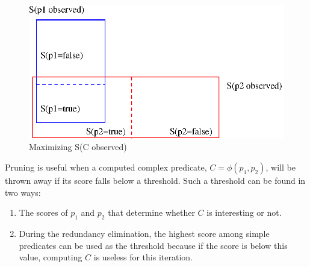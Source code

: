 \begin{figure}[h]
  \centering
  \includegraphics[scale = 0.6]{charts/maxsuccess}
  \caption{Maximizing S(C observed)}
  \label{maxsuccess}
\end{figure}


Pruning is useful when a computed complex predicate, $C = \phi(p_1, p_2)$, will be thrown away if its score falls below a threshold.  Such a threshold can be found in two ways:
\begin{enumerate}
\item The scores of $p_1$ and $p_2$ that determine whether $C$ is interesting or not.
\item During the redundancy elimination, the highest %
score among simple predicates can be used as the threshold because if the score is below this value, computing $C$ is useless for this iteration.
\end{enumerate}
